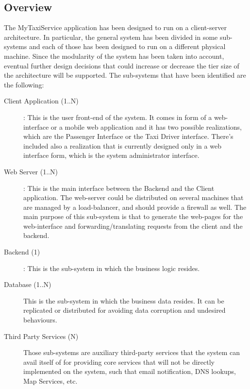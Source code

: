 \documentclass[11pt, a4paper,titlepage]{article}
\newcommand{\productname}{MyTaxiService }
\begin{document}
\subsection{Overview}
The \productname application has been designed to run on a client-server architecture. \newline
In particular, the general system has been divided in some sub-systems and each of those has been designed to run on a different physical machine.
Since the modularity of the system has been taken into account, eventual further design decisions that could increase or decrease the tier size of the architecture will be supported. \newline
The sub-systems that have been identified are the following:
\begin{description}
	\item[Client Application (1..N)]: This is the user front-end of the system. It comes in form of a web-interface or a mobile web application and it has two possible realizations, which are the Passenger Interface or the Taxi Driver interface. 
	There's included also a realization that is currently designed only in a web interface form, which is the system administrator interface.
	\item[Web Server (1..N)]: This is the main interface between the Backend and the Client application. The web-server could be distributed on several machines that are managed by a load-balancer, and should provide a firewall as well. The main purpose of this sub-system is that to generate the web-pages for the web-interface and forwarding/translating requests from the client and the backend.
	\item[Backend (1)]: This is the sub-system in which the business logic resides.
	\item[Database (1..N)] This is the sub-system in which the business data resides. It can be replicated or distributed for avoiding data corruption and undesired behaviours.
	\item[Third Party Services (N)] Those sub-systems are auxiliary third-party services that the system can avail itself of for providing core services that will not be directly implemented on the system, such that email notification, DNS lookups, Map Services, etc. 
\end{description}
\newpage
\end{document}
